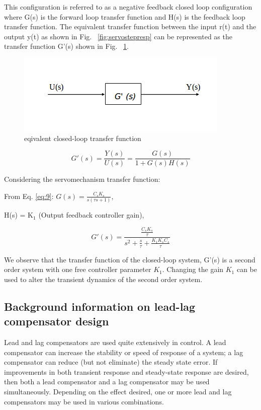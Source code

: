 \documentclass[11pt,a4paper]{article}
\begin{document}
This configuration is referred to as a negative feedback closed loop configuration where G(s) is the forward loop transfer function and H(s) is the feedback loop transfer function. The equivalent transfer function between the input r(t) and the output y(t) as shown in Fig. ~\ref{fig:servostepresp} can be represented as the transfer function G'(s) shown in Fig. ~\ref{fig:servocltfblock}.

\begin{figure}[here]
\includegraphics{imglab/servocltfblock.png}
\caption{eqivalent closed-loop transfer function}
\label{fig:servocltfblock}
\end{figure}

\begin{equation} \label{eq:15}
G'(s)=\frac{Y(s)}{U(s)}=\frac{G(s)}{1+G(s)H(s)}
\end{equation}

Considering the servomechanism transfer function:

From Eq. \ref{eq:9}: $G(s)=\frac{C_{s}K_{s}}{s(\tau s + 1)}$,

H(s) = K$_{1}$ (Output feedback controller gain),

\begin{equation} \label{eq:16}
G'(s)=\frac{\frac{C_{s}K_{s}}{\tau}}{s^{2} + \frac{s}{\tau} + \frac{K_{1}K_{s}C_{s}}{\tau}}
\end{equation}

We observe that the transfer function of the closed-loop system, G'(s) is a second order system with one free controller parameter $K_{1}$. Changing the gain $K_{1}$ can be used to alter the transient dynamics of the second order system.

\subsection{Background information on lead-lag compensator design}
Lead and lag compensators are used quite extensively in control. A lead compensator can increase the stability or speed of response of a system; a lag compensator can reduce (but not eliminate) the steady state error. If improvements in both transient response and steady-state response are desired, then both a lead compensator and a lag compensator may be used simultaneously. Depending on the effect desired, one or more lead and lag compensators may be used in various combinations.
\end{document}
